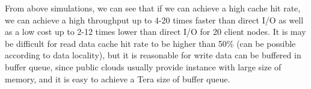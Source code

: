 From above simulations, we can see that if we can achieve a high cache hit rate, we can achieve a high throughput up to 4-20 times faster than direct I/O as well as a low cost up to 2-12 times lower than direct I/O for 20 client nodes.
It is may be difficult for read data cache hit rate to be higher than 50\% (can be possible according to data locality), but it is reasonable for write data can be buffered in buffer queue, since public clouds usually provide instance with large size of memory, and it is easy to achieve a Tera size of buffer queue.
